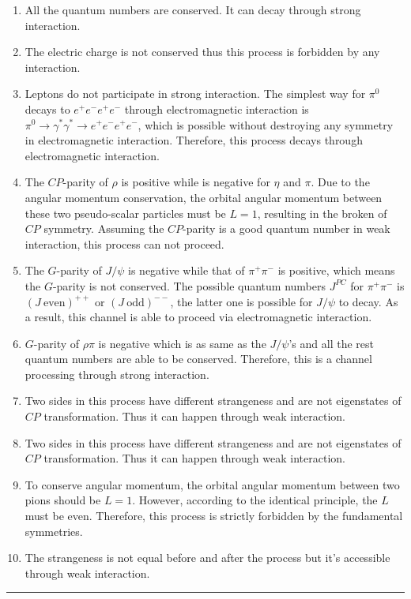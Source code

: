\documentclass[12pt,twoside]{report}
\newcommand{\pip}{\pi^+}
\newcommand{\piz}{\pi^0}
\newcommand{\pim}{\pi^-}
\numberwithin{problemname}{chapter}
\newenvironment{solution}{\vspace{1em}\par\noindent{\large\textbf{\textsc{Solution}}}\par}{\vspace{1em}\hrule}
\begin{document}
\begin{solution}
\begin{enumerate}[1)]
    \item All the quantum numbers are conserved. It can decay through strong interaction.
    \item The electric charge is not conserved thus this process is forbidden by any interaction.
    \item Leptons do not participate in strong interaction. The simplest way for $\piz$ decays to $e^+e^-e^+e^-$ through electromagnetic interaction is $\piz\to\gamma^*\gamma^*\to e^+e^-e^+e^-$, which is possible without destroying any symmetry in electromagnetic interaction. Therefore, this process decays through electromagnetic interaction.
    \item The $CP$-parity of $\rho$ is positive while is negative for $\eta$ and $\pi$. Due to the angular momentum conservation, the orbital angular momentum between these two pseudo-scalar particles must be $L=1$, resulting in the broken of $CP$ symmetry. Assuming the $CP$-parity is a good quantum number in weak interaction, this process can not proceed.
    \item The $G$-parity of $J/\psi$ is negative while that of $\pip\pim$ is positive, which means the $G$-parity is not conserved. The possible quantum numbers $J^{PC}$ for $\pip\pim$ is $(J~\mathrm{even})^{++}$ or $(J~\mathrm{odd})^{--}$, the latter one is possible for $J/\psi$ to decay. As a result, this channel is able to proceed via electromagnetic interaction.
    \item $G$-parity of $\rho\pi$ is negative which is as same as the $J/\psi$'s and all the rest quantum numbers are able to be conserved. Therefore, this is a channel processing through strong interaction.
    \item Two sides in this process have different strangeness and are not eigenstates of $CP$ transformation. Thus it can happen through weak interaction.
    \item Two sides in this process have different strangeness and are not eigenstates of $CP$ transformation. Thus it can happen through weak interaction.
    \item To conserve angular momentum, the orbital angular momentum between two pions should be $L=1$. However, according to the identical principle, the $L$ must be even. Therefore, this process is strictly forbidden by the fundamental symmetries.
    \item The strangeness is not equal before and after the process but it's accessible through weak interaction.

\end{enumerate}
\end{solution}
\end{document}
